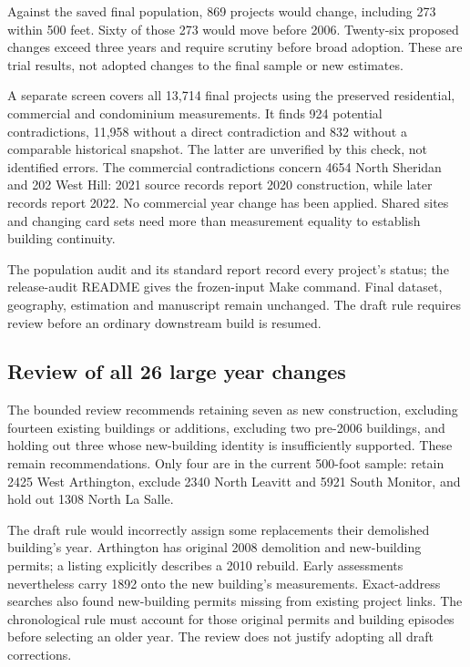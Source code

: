 Against the saved final population, 869 projects would change, including 273
within 500 feet. Sixty of those 273 would move before 2006. Twenty-six proposed
changes exceed three years and require scrutiny before broad adoption. These
are trial results, not adopted changes to the final sample or new estimates.

A separate screen covers all 13,714 final projects using the preserved residential,
commercial and condominium measurements. It finds 924 potential contradictions,
11,958 without a direct contradiction and 832 without a comparable historical
snapshot. The latter are unverified by this check, not identified errors.
The commercial contradictions concern 4654 North Sheridan and 202 West Hill:
2021 source records report 2020 construction, while later records report 2022.
No commercial year change has been applied. Shared sites and changing card sets
need more than measurement equality to establish building continuity.

The population audit and its standard report record every project's status;
the release-audit README gives the frozen-input Make command. Final dataset,
geography, estimation and manuscript remain unchanged. The draft rule requires
review before an ordinary downstream build is resumed.

\subsection*{Review of all 26 large year changes}
The bounded review recommends retaining seven as new construction, excluding
fourteen existing buildings or additions, excluding two pre-2006 buildings, and
holding out three whose new-building identity is insufficiently supported.
These remain recommendations. Only four are in the current 500-foot sample:
retain 2425 West Arthington, exclude 2340 North Leavitt and 5921 South Monitor,
and hold out 1308 North La Salle.

The draft rule would incorrectly assign some replacements their demolished
building's year. Arthington has original 2008 demolition and new-building permits;
a listing explicitly describes a 2010 rebuild. Early assessments nevertheless
carry 1892 onto the new building's measurements. Exact-address searches also found
new-building permits missing from existing project links. The chronological rule
must account for those original permits and building episodes before selecting
an older year. The review does not justify adopting all draft corrections.

